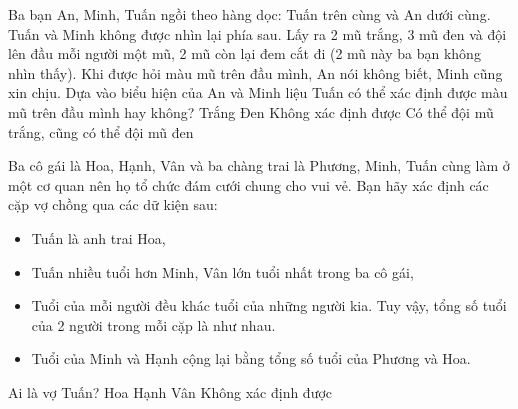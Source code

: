 \begin{ex}
Ba bạn An, Minh, Tuấn ngồi theo hàng dọc: Tuấn trên cùng và An dưới cùng. Tuấn và Minh không được nhìn lại phía sau. Lấy ra 2 mũ trắng, 3 mũ đen và đội lên đầu mỗi người một mũ, 2 mũ còn lại đem cắt đi (2 mũ này ba bạn không nhìn thấy). Khi được hỏi màu mũ trên đầu mình, An nói không biết, Minh cũng xin chịu. Dựa vào biểu hiện của An và Minh liệu Tuấn có thể xác định được màu mũ trên đầu mình hay không?
\choice
{Trắng}
{\True Đen}
{Không xác định được}
{Có thể đội mũ trắng, cũng có thể đội mũ đen}
\end{ex}

\begin{ex}
Ba cô gái là Hoa, Hạnh, Vân và ba chàng trai là Phương, Minh, Tuấn cùng làm ở một cơ quan nên họ tổ chức đám cưới chung cho vui vẻ. Bạn hãy xác định các cặp vợ chồng qua các dữ kiện sau:
\begin{itemize}
\item Tuấn là anh trai Hoa,
\item Tuấn nhiều tuổi hơn Minh, Vân lớn tuổi nhất trong ba cô gái,
\item Tuổi của mỗi người đều khác tuổi của những người kia. Tuy vậy, tổng số tuổi của 2 người trong mỗi cặp
là như nhau.
\item Tuổi của Minh và Hạnh cộng lại bằng tổng số tuổi của Phương và Hoa.
\end{itemize}
Ai là vợ Tuấn?
\choice
{Hoa}
{\True Hạnh}
{Vân}
{Không xác định được}
\end{ex}

